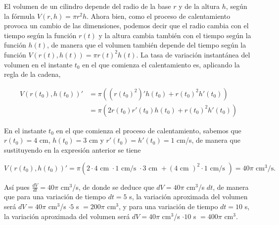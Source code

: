 \documentclass[
  spanish,
  a4paper,
]{scrreport}
\theoremstyle{definition}
\theoremstyle{remark}
\begin{document}
\begin{tcolorbox}[enhanced jigsaw, arc=.35mm, bottomrule=.15mm, bottomtitle=1mm, breakable, colback=white, colbacktitle=quarto-callout-tip-color!10!white, colframe=quarto-callout-tip-color-frame, coltitle=black, left=2mm, leftrule=.75mm, opacityback=0, opacitybacktitle=0.6, rightrule=.15mm, title=\textcolor{quarto-callout-tip-color}{\faLightbulb}\hspace{0.5em}{Solución}, titlerule=0mm, toprule=.15mm, toptitle=1mm]

El volumen de un cilindro depende del radio de la base \(r\) y de la
altura \(h\), según la fórmula \(V(r,h)=\pi r^2h\). Ahora bien, como el
proceso de calentamiento provoca un cambio de las dimensiones, podemos
decir que el radio cambia con el tiempo según la función \(r(t)\) y la
altura cambia también con el tiempo según la función \(h(t)\), de manera
que el volumen también depende del tiempo según la función
\(V(r(t),h(t))=\pi r(t)^2h(t)\). La tasa de variación instantánea del
volumen en el instante \(t_0\) en el que comienza el calentamiento es,
aplicando la regla de la cadena,

\begin{align*}
V(r(t_0),h(t_0))' &= \pi((r(t_0)^2)'h(t_0)+r(t_0)^2h'(t_0)) \\ 
&= \pi(2r(t_0)r'(t_0)h(t_0)+r(t_0)^2h'(t_0))
\end{align*}

En el instante \(t_0\) en el que comienza el proceso de calentamiento,
sabemos que \(r(t_0)=4\) cm, \(h(t_0)=3\) cm y \(r'(t_0)=h'(t_0)=1\)
cm/s, de manera que sustituyendo en la expresión anterior se tiene

\[
V(r(t_0),h(t_0))' = \pi(2\cdot 4 \mbox{ cm }\cdot 1 \mbox{ cm/s } \cdot 3 \mbox{ cm }+ (4 \mbox{ cm })^2 \cdot 1 \mbox{ cm/s }) = 40\pi \mbox{ cm$^3$/s}.
\]

Así pues \(\frac{dV}{dt}=40\pi\) cm\(^3\)/s, de donde se deduce que
\(dV = 40\pi\) cm\(^3\)/s \(dt\), de manera que para una variación de
tiempo \(dt=5\) s, la variación aproximada del volumen será
\(dV = 40\pi\) cm\(^3\)/s \(\cdot 5\) s \(= 200\pi\) cm\(^3\), y para
una variación de tiempo \(dt=10\) s, la variación aproximada del volumen
será \(dV = 40\pi\) cm\(^3\)/s \(\cdot 10\) s \(= 400\pi\) cm\(^3\).

\end{tcolorbox}
\end{document}

